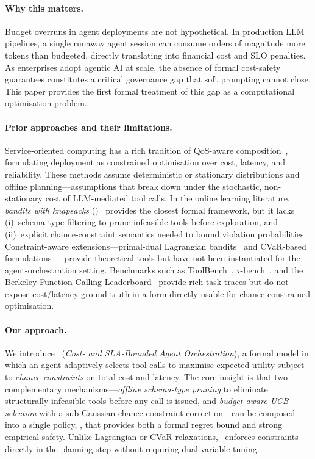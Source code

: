 \paragraph{Why this matters.}
Budget overruns in agent deployments are not hypothetical. In
production LLM pipelines, a single runaway agent session can
consume orders of magnitude more tokens than budgeted, directly
translating into financial cost and SLO penalties. As enterprises
adopt agentic AI at scale, the absence of formal cost-safety
guarantees constitutes a critical governance gap that soft prompting
cannot close. This paper provides the first formal treatment of this
gap as a computational optimisation problem.

\paragraph{Prior approaches and their limitations.}
Service-oriented computing has a rich tradition of QoS-aware
composition~\cite{zeng2004qos,alrifai2009qos}, formulating
deployment as constrained optimisation over cost, latency, and
reliability. These methods assume deterministic or stationary
distributions and offline planning---assumptions that break down
under the stochastic, non-stationary cost of LLM-mediated tool
calls. In the online learning literature, \emph{bandits with
knapsacks} (\BwK)~\cite{bwk2018} provides the closest formal
framework, but it lacks (i)~schema-type filtering to prune
infeasible tools before exploration, and (ii)~explicit
chance-constraint semantics needed to bound violation probabilities.
Constraint-aware extensions---primal-dual Lagrangian
bandits~\cite{mahdavi2012tradeoff,agrawal2014bwk} and
CVaR-based formulations~\cite{tamkin2020cvar}---provide
theoretical tools but have not been instantiated for the
agent-orchestration setting. Benchmarks such as
ToolBench~\cite{qin2023toolllm}, $\tau$-bench~\cite{yao2024taubench},
and the Berkeley Function-Calling
Leaderboard~\cite{bfcl2024} provide rich task traces but do not
expose cost/latency ground truth in a form directly usable for
chance-constrained optimisation.

\paragraph{Our approach.}
We introduce \CBSLAO~(\emph{Cost- and SLA-Bounded Agent
Orchestration}), a formal model in which an agent adaptively
selects tool calls to maximise expected utility subject to
\emph{chance constraints} on total cost and latency. The core
insight is that two complementary mechanisms---\emph{offline
schema-type pruning} to eliminate structurally infeasible tools
before any call is issued, and \emph{budget-aware UCB selection}
with a sub-Gaussian chance-constraint correction---can be composed
into a single policy, \CBUC, that provides both a formal regret
bound and strong empirical safety. Unlike Lagrangian or CVaR
relaxations, \CBUC~enforces constraints directly in the planning
step without requiring dual-variable tuning.

